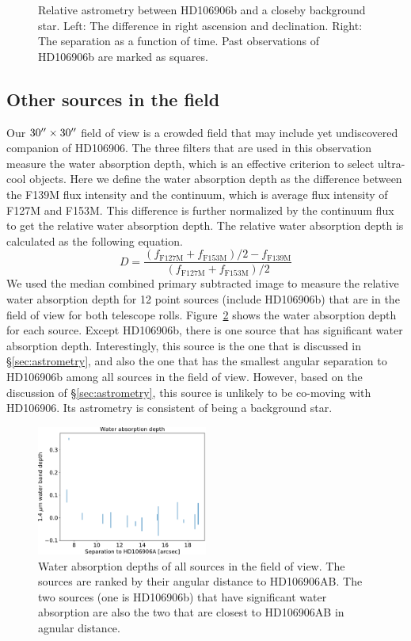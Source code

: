 \documentclass[modern]{aastex62}
\begin{document}
\begin{figure}
  \centering
  \caption{Relative astrometry between HD106906b and a closeby background star. Left: The difference in right ascension and declination. Right: The separation as a function of time. Past observations of HD106906b are marked as squares.}
  \label{fig:astrometry:bck}
\end{figure}

\subsection{Other sources in the field}
Our $30\mbox{$^{\prime\prime}$}\times30\mbox{$^{\prime\prime}$}$ field of view is a crowded field that may include yet undiscovered companion of HD106906. The three filters that are used in this observation measure the water absorption depth, which is an effective criterion to select ultra-cool objects. Here we define the water absorption depth as the difference between the F139M flux intensity and the continuum, which is average flux intensity of F127M and F153M. This difference is further normalized by the continuum flux to get the relative water absorption depth. The relative water absorption depth is calculated as the following equation.
\begin{equation}
D = \frac{(f_{\mathrm{F127M}} + f_\mathrm{F153M})/2 - f_{\mathrm{F139M}}}{(f_{\mathrm{F127M}} + f_\mathrm{{F153M}})/2}
\end{equation}
We used the median combined primary subtracted image to measure the relative water absorption depth for 12 point sources (include HD106906b) that are in the field of view for both telescope rolls. Figure~\ref{fig:backgroundsources} shows the water absorption depth for each source. Except HD106906b, there is one source that has significant water absorption depth. Interestingly, this source is the one that is discussed in \S\ref{sec:astrometry}, and also the one that has the smallest angular separation to HD106906b among all sources in the field of view. However, based on the discussion of \S\ref{sec:astrometry}, this source is unlikely to be co-moving with HD106906. Its astrometry is consistent of being a background star.

\begin{figure}
  \centering
  \includegraphics[width=0.5\textwidth]{figures/bck_waterdepth.pdf}
  \caption{Water absorption depths of all sources in the field of view. The sources are ranked by their angular distance to HD106906AB. The two sources (one is HD106906b) that have significant water absorption are also the two that are closest to HD106906AB in agnular distance.}
  \label{fig:backgroundsources}
\end{figure}
\end{document}
